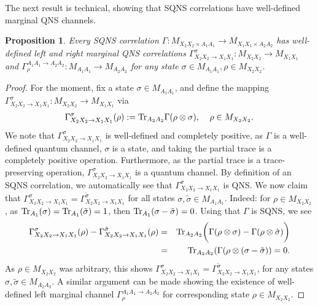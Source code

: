 \documentclass[11pt]{amsart}
\newtheorem{proposition}[theorem]{Proposition}
\begin{document}
The next result is technical, showing that SQNS correlations have well-defined marginal QNS channels. %
\begin{proposition}\label{sqns_marginals}
Every SQNS correlation $\Gamma: M_{X_{2}X_{2}\times A_{1}A_{1}}\rightarrow M_{X_{1}X_{1}\times A_{2}A_{2}}$ has well-defined left and right marginal QNS correlations $\Gamma_{X_{2}X_{2}\rightarrow X_{1}X_{1}}^{\sigma}: M_{X_{2}X_{2}}\rightarrow M_{X_{1}X_{1}}$ and $\Gamma_{\rho}^{A_{1}A_{1}\rightarrow A_{2}A_{2}}: M_{A_{1}A_{1}}\rightarrow M_{A_{2}A_{2}}$ for any state $\sigma \in M_{A_{1}A_{1}}, \rho \in M_{X_{2}X_{2}}$.
\end{proposition}
\begin{proof}
For the moment, fix a state $\sigma \in M_{A_{1}A_{1}}$, and define the mapping $\Gamma_{X_{2}X_{2}\rightarrow X_{1}X_{1}}^{\sigma}: M_{X_{2}X_{2}}\rightarrow M_{X_{1}X_{1}}$ via
\begin{gather*}
	\Gamma_{X_{2}X_{2}\rightarrow X_{1}X_{1}}^{\sigma}(\rho) := {\rm Tr}_{A_{2}A_{2}}\Gamma(\rho\otimes \sigma), \;\;\;\; \rho \in M_{X_{2}X_{2}}.
\end{gather*}
\noindent We note that $\Gamma_{X_{2}X_{2}\rightarrow X_{1}X_{1}}^{\sigma}$ is well-defined and completely positive, as $\Gamma$ is a well-defined quantum channel, $\sigma$ is a state, and taking the partial trace is a completely positive operation. Furthermore, as the partial trace is a trace-preserving operation, $\Gamma_{X_{2}X_{2}\rightarrow X_{1}X_{1}}^{\sigma}$ is a quantum channel. By definition of an SQNS correlation, we automatically see that $\Gamma_{X_{2}X_{2}\rightarrow X_{1}X_{1}}^{\sigma}$ is QNS. We now claim that $\Gamma_{X_{2}X_{2}\rightarrow X_{1}X_{1}}^{\sigma} = \Gamma_{X_{2}X_{2}\rightarrow X_{1}X_{1}}^{\tilde{\sigma}}$ for all states $\sigma, \tilde{\sigma} \in M_{A_{1}A_{1}}$. Indeed: for $\rho \in M_{X_{2}X_{2}}$, as ${\rm Tr}_{A_{1}}(\sigma) = {\rm Tr}_{A_{1}}(\tilde{\sigma}) = 1$, then ${\rm Tr}_{A_{1}}(\sigma-\tilde{\sigma}) = 0$. Using that $\Gamma$ is SQNS, we see
\begin{eqnarray*}
	\Gamma_{X_{2}X_{2}\rightarrow X_{1}X_{1}}^{\sigma}(\rho)-\Gamma_{X_{2}X_{2}\rightarrow X_{1}X_{1}}^{\tilde{\sigma}}(\rho) 
& = &
	{\rm Tr}_{A_{2}A_{2}}\bigg(\Gamma(\rho\otimes \sigma)-\Gamma(\rho\otimes \tilde{\sigma})\bigg) \\
& = &
	{\rm Tr}_{A_{2}A_{2}}(\Gamma(\rho\otimes (\sigma-\tilde{\sigma})) = 0.
\end{eqnarray*}
\noindent As $\rho \in M_{X_{2}X_{2}}$ was arbitrary, this shows $\Gamma_{X_{2}X_{2}\rightarrow X_{1}X_{1}}^{\sigma} = \Gamma_{X_{2}X_{2}\rightarrow X_{1}X_{1}}^{\tilde{\sigma}}$, for any states $\sigma, \tilde{\sigma} \in M_{A_{2}A_{2}}$. A similar argument can be made showing the existence of well-defined left marginal channel $\Gamma_{\rho}^{A_{1}A_{1}\rightarrow A_{2}A_{2}}$ for corresponding state $\rho \in M_{X_{2}X_{2}}$.
\end{proof}
\end{document}
